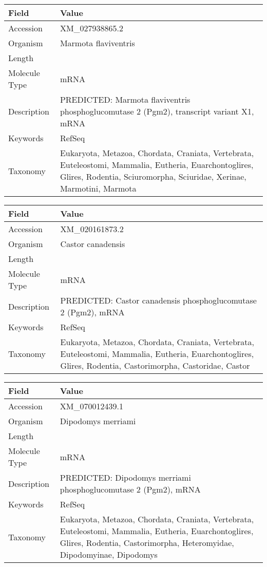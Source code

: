 \documentclass[10pt]{article}
\begin{document}
\vspace{1em}
{\footnotesize
\begin{longtable}{>{\raggedright\arraybackslash}p{4.5cm} >{\raggedright\arraybackslash}p{11.5cm}}
\textbf{Field} & \textbf{Value} \\
\hline
Accession & XM\_027938865.2 \\
Organism & Marmota flaviventris \\
Length & 2265 \\
Molecule Type & mRNA \\
Description & PREDICTED: Marmota flaviventris phosphoglucomutase 2 (Pgm2), transcript variant X1, mRNA \\
Keywords & RefSeq \\
Taxonomy & Eukaryota, Metazoa, Chordata, Craniata, Vertebrata, Euteleostomi, Mammalia, Eutheria, Euarchontoglires, Glires, Rodentia, Sciuromorpha, Sciuridae, Xerinae, Marmotini, Marmota \\
\end{longtable}
}

\vspace{1em}
{\footnotesize
\begin{longtable}{>{\raggedright\arraybackslash}p{4.5cm} >{\raggedright\arraybackslash}p{11.5cm}}
\textbf{Field} & \textbf{Value} \\
\hline
Accession & XM\_020161873.2 \\
Organism & Castor canadensis \\
Length & 2543 \\
Molecule Type & mRNA \\
Description & PREDICTED: Castor canadensis phosphoglucomutase 2 (Pgm2), mRNA \\
Keywords & RefSeq \\
Taxonomy & Eukaryota, Metazoa, Chordata, Craniata, Vertebrata, Euteleostomi, Mammalia, Eutheria, Euarchontoglires, Glires, Rodentia, Castorimorpha, Castoridae, Castor \\
\end{longtable}
}

\vspace{1em}
{\footnotesize
\begin{longtable}{>{\raggedright\arraybackslash}p{4.5cm} >{\raggedright\arraybackslash}p{11.5cm}}
\textbf{Field} & \textbf{Value} \\
\hline
Accession & XM\_070012439.1 \\
Organism & Dipodomys merriami \\
Length & 2634 \\
Molecule Type & mRNA \\
Description & PREDICTED: Dipodomys merriami phosphoglucomutase 2 (Pgm2), mRNA \\
Keywords & RefSeq \\
Taxonomy & Eukaryota, Metazoa, Chordata, Craniata, Vertebrata, Euteleostomi, Mammalia, Eutheria, Euarchontoglires, Glires, Rodentia, Castorimorpha, Heteromyidae, Dipodomyinae, Dipodomys \\
\end{longtable}
}
\end{document}
